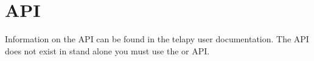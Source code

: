 \chapter{API}

Information on the \gaia API can be found in the telapy user documentation. The
\gaia API does not exist in stand alone you must use the  or
 API.
